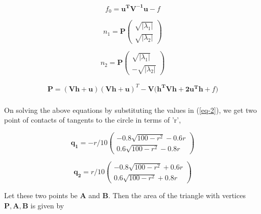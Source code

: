 \documentclass[journal,10.75pt,twocolumn]{IEEEtran}
\newcommand{\myvec}[1]{\ensuremath{\begin{pmatrix}#1\end{pmatrix}}}
\let\vec\mathbf
\begin{document}
\vspace{0.2cm}

\begin{equation}
f_0 = \vec{{\vec{u^T} \vec{V^{-1}} \vec{u}}}-f \label{eq-5}
\end{equation}

\vspace{0.2cm}

\begin{equation}
n_1 = \vec{P}\myvec{\sqrt{|\lambda_1|} \\ \sqrt{|\lambda_2|}} \label{eq-6}
\end{equation}

\vspace{0.2cm}

\begin{equation}
n_2 = \vec{P}\myvec{\sqrt{|\lambda_1|} \\ -\sqrt{|\lambda_2|}} \label{eq-7}
\end{equation}

\vspace{0.2cm}

\begin{align}
\vec{P} = (\vec{Vh+u})(\vec{Vh+u})^T-\vec{V(h^TVh+2u^Th}+f) \label{eq-8}
\end{align}
\\
On solving the above equations by substituting the values in (\ref{eq-2}), we get two point of contacts of tangents to the circle in terms of 'r',

\begin{equation}
\vec{q_1} = -r/10 \begin{pmatrix}
{-0.8 \sqrt{100 - r^2} - 0.6r} \\
{0.6 \sqrt{100 - r^2}} -0.8r 
\end{pmatrix}  \label{eq-9}
\end{equation}

\begin{equation}
\vec{q_2} = r/10 \begin{pmatrix}
{-0.8 \sqrt{100 - r^2} + 0.6r} \\
{0.6 \sqrt{100 - r^2}} + 0.8r 
\end{pmatrix}  \label{eq-10}
\end{equation}

\vspace{0.2cm}

Let these two points be $\vec{A}$ and $\vec{B}$. Then the area of the triangle with vertices $\vec{P}, \vec{A}, \vec{B}$ is given by
\\
\end{document}
